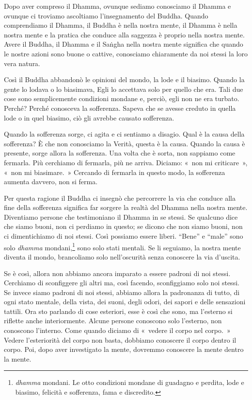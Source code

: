 Dopo aver compreso il Dhamma, ovunque sediamo conosciamo il Dhamma e
ovunque ci troviamo ascoltiamo l'insegnamento del Buddha. Quando
comprendiamo il Dhamma, il Buddha è nella nostra mente, il Dhamma è
nella nostra mente e la pratica che conduce alla saggezza è proprio
nella nostra mente. Avere il Buddha, il Dhamma e il Saṅgha nella nostra
mente significa che quando le nostre azioni sono buone o cattive,
conosciamo chiaramente da noi stessi la loro vera natura.

Così il Buddha abbandonò le opinioni del mondo, la lode e il biasimo.
Quando la gente lo lodava o lo biasimava, Egli lo accettava solo per
quello che era. Tali due cose sono semplicemente condizioni mondane e,
perciò, egli non ne era turbato. Perché? Perché conosceva la sofferenza.
Sapeva che se avesse creduto in quella lode o in quel biasimo, ciò gli
avrebbe causato sofferenza.

Quando la sofferenza sorge, ci agita e ci sentiamo a disagio. Qual è la
causa della sofferenza? È che non conosciamo la Verità, questa è la
causa. Quando la causa è presente, sorge allora la sofferenza. Una volta
che è sorta, non sappiamo come fermarla. Più cerchiamo di fermarla, più
ne arriva. Diciamo: «~non mi criticare~», «~non mi biasimare.~» Cercando
di fermarla in questo modo, la sofferenza aumenta davvero, non si ferma.

Per questa ragione il Buddha ci insegnò che percorrere la via che
conduce alla fine della sofferenza significa far sorgere la realtà del
Dhamma nella nostra mente. Diventiamo persone che testimoniano il Dhamma
in se stessi. Se qualcuno dice che siamo buoni, non ci perdiamo in
questo; se dicono che non siamo buoni, non ci dimentichiamo di noi
stessi. Così possiamo essere liberi. ``Bene'' e ``male'' sono solo
\emph{dhamma} mondani,\footnote{\emph{dhamma} mondani. Le otto
  condizioni mondane di guadagno e perdita, lode e biasimo, felicità e
  sofferenza, fama e discredito.} sono solo stati mentali. Se li
seguiamo, la nostra mente diventa il mondo, brancoliamo solo
nell'oscurità senza conoscere la via d'uscita.

Se è così, allora non abbiamo ancora imparato a essere padroni di noi
stessi. Cerchiamo di sconfiggere gli altri ma, così facendo,
sconfiggiamo solo noi stessi. Se invece siamo padroni di noi stessi,
abbiamo allora la padronanza di tutto, di ogni stato mentale, della
vista, dei suoni, degli odori, dei sapori e delle sensazioni tattili.
Ora sto parlando di cose esteriori, esse è così che sono, ma l'esterno
si riflette anche interiormente. Alcune persone conoscono solo
l'esterno, non conoscono l'interno. Come quando diciamo di «~vedere il
corpo nel corpo.~» Vedere l'esteriorità del corpo non basta, dobbiamo
conoscere il corpo dentro il corpo. Poi, dopo aver investigato la mente,
dovremmo conoscere la mente dentro la mente.

